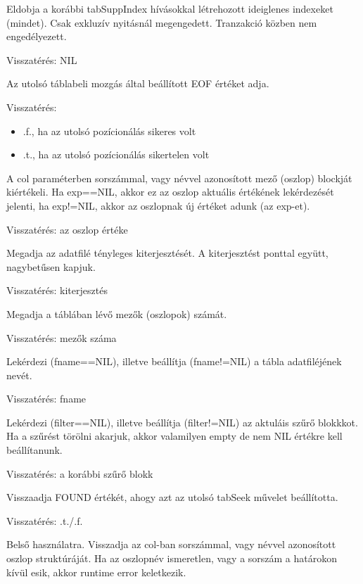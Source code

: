 Eldobja a korábbi tabSuppIndex hívásokkal létrehozott ideiglenes
indexeket (mindet). Csak exkluzív nyitásnál megengedett.
Tranzakció közben nem engedélyezett.

Visszatérés: NIL


Az utolsó táblabeli mozgás által beállított EOF értéket adja.
 
Visszatérés:
\begin{itemize}
\item .f., ha az utolsó pozícionálás sikeres volt
\item .t., ha az utolsó pozícionálás sikertelen volt 
\end{itemize}
 
A col paraméterben sorszámmal, vagy névvel azonosított mező (oszlop)
blockját kiértékeli. Ha exp==NIL, akkor ez az oszlop aktuális értékének
lekérdezését jelenti, ha exp!=NIL, akkor az oszlopnak új értéket
adunk (az exp-et).

Visszatérés: az oszlop értéke



Megadja az adatfilé tényleges kiterjesztését. A kiterjesztést
ponttal együtt, nagybetűsen kapjuk.

Visszatérés: kiterjesztés


Megadja a táblában lévő mezők (oszlopok) számát.

Visszatérés: mezők száma
 

 
Lekérdezi (fname==NIL), illetve beállítja (fname!=NIL) 
a tábla adatfiléjének nevét.

Visszatérés: fname
 

Lekérdezi (filter==NIL), illetve beállítja (filter!=NIL) 
az aktuláis szűrő blokkkot. Ha a szűrést törölni akarjuk, 
akkor valamilyen empty de nem NIL értékre kell beállítanunk.

Visszatérés: a korábbi szűrő blokk


Visszaadja FOUND értékét, ahogy azt az utolsó tabSeek
művelet beállította.

Visszatérés: .t./.f.


Belső használatra. Visszadja az col-ban sorszámmal, vagy
névvel azonosított oszlop struktúráját. Ha az oszlopnév ismeretlen,
vagy a sorszám a  határokon kívül esik, akkor runtime error keletkezik.

